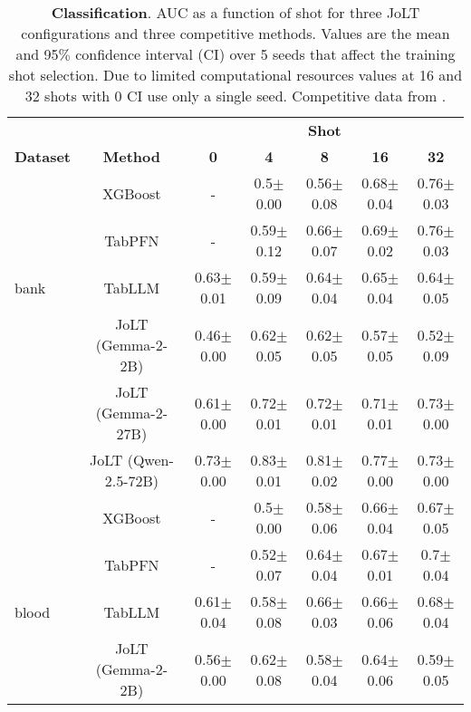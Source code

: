 \begin{table*}[htbp]
  \centering
  \caption{\textbf{Classification}. AUC as a function of shot for three JoLT configurations and three competitive methods. Values are the mean and 95$\%$ confidence interval (CI) over 5 seeds that affect the training shot selection. Due to limited computational resources values at 16 and 32 shots with 0 CI use only a single seed. Competitive data from \citep{hegselmann2023tabllm}.}
  \label{tab:classification_results}%
  \vskip 0.05in
  \begin{small}
  \begin{sc}
  \begin{adjustbox}{max width=\textwidth}
    \begin{tabular}{rcccccc}
    \toprule
          &       & \multicolumn{5}{c}{\textbf{Shot}} \\
\cmidrule{3-7}    \multicolumn{1}{l}{\textbf{Dataset}} & \textbf{Method} & \textbf{0} & \textbf{4} & \textbf{8} & \textbf{16} & \textbf{32} \\
    \midrule
          & XGBoost & -     & 0.5$\pm$0.00 & 0.56$\pm$0.08 & 0.68$\pm$0.04 & 0.76$\pm$0.03 \\
          & TabPFN & -     & 0.59$\pm$0.12 & 0.66$\pm$0.07 & 0.69$\pm$0.02 & 0.76$\pm$0.03 \\
    \multicolumn{1}{l}{bank} & TabLLM & 0.63$\pm$0.01 & 0.59$\pm$0.09 & 0.64$\pm$0.04 & 0.65$\pm$0.04 & 0.64$\pm$0.05 \\
          & JoLT (Gemma-2-2B) & 0.46$\pm$0.00 & 0.62$\pm$0.05 & 0.62$\pm$0.05 & 0.57$\pm$0.05 & 0.52$\pm$0.09 \\
          & JoLT (Gemma-2-27B) & 0.61$\pm$0.00 & 0.72$\pm$0.01 & 0.72$\pm$0.01 & 0.71$\pm$0.01 & 0.73$\pm$0.00 \\
          & JoLT (Qwen-2.5-72B) & 0.73$\pm$0.00 & 0.83$\pm$0.01 & 0.81$\pm$0.02 & 0.77$\pm$0.00 & 0.73$\pm$0.00 \\
    \midrule
          & XGBoost & -     & 0.5$\pm$0.00 & 0.58$\pm$0.06 & 0.66$\pm$0.04 & 0.67$\pm$0.05 \\
          & TabPFN & -     & 0.52$\pm$0.07 & 0.64$\pm$0.04 & 0.67$\pm$0.01 & 0.7$\pm$0.04 \\
    \multicolumn{1}{l}{blood} & TabLLM & 0.61$\pm$0.04 & 0.58$\pm$0.08 & 0.66$\pm$0.03 & 0.66$\pm$0.06 & 0.68$\pm$0.04 \\
          & JoLT (Gemma-2-2B) & 0.56$\pm$0.00 & 0.62$\pm$0.08 & 0.58$\pm$0.04 & 0.64$\pm$0.06 & 0.59$\pm$0.05 \\

\end{tabular}
\end{adjustbox}
\end{sc}
\end{small}
\end{table*}
